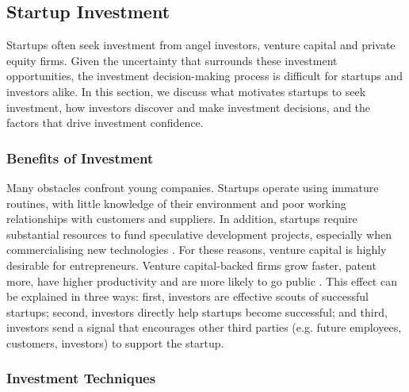 \documentclass[../thesis/thesis.tex]{subfiles}
\begin{document}
\begin{refsection}
\begin{description}
\end{description}

\subsection{Startup Investment}

Startups often seek investment from angel investors, venture capital and private equity firms. Given the uncertainty that surrounds these investment opportunities, the investment decision-making process is difficult for startups and investors alike. In this section, we discuss what motivates startups to seek investment, how investors discover and make investment decisions, and the factors that drive investment confidence.

\subsubsection{Benefits of Investment}

Many obstacles confront young companies. Startups operate using immature routines, with little knowledge of their environment and poor working relationships with customers and suppliers. In addition, startups require substantial resources to fund speculative development projects, especially when commercialising new technologies \cite{gans2003}. For these reasons, venture capital is highly desirable for entrepreneurs. Venture capital-backed firms grow faster, patent more, have higher productivity and are more likely to go public \cite{baum2004,hochberg2007}. This effect can be explained in three ways: first, investors are effective scouts of successful startups; second, investors directly help startups become successful; and third, investors send a signal that encourages other third parties (e.g. future employees, customers, investors) to support the startup.

\subsubsection{Investment Techniques}


\end{refsection}
\end{document}
